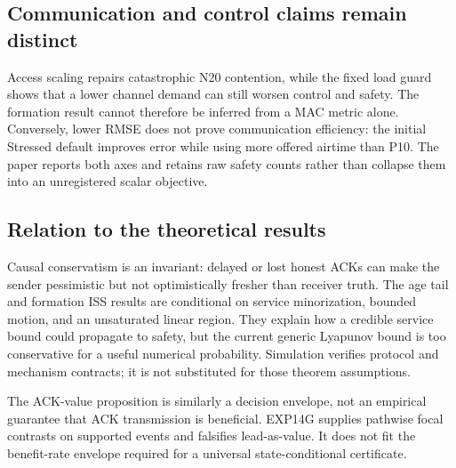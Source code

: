 \subsection{Communication and control claims remain distinct}

Access scaling repairs catastrophic N20 contention, while the fixed load guard
shows that a lower channel demand can still worsen control and safety. The
formation result cannot therefore be inferred from a MAC metric alone.
Conversely, lower RMSE does not prove communication efficiency: the initial
Stressed default improves error while using more offered airtime than P10.
The paper reports both axes and retains raw safety counts rather than collapse
them into an unregistered scalar objective.

\subsection{Relation to the theoretical results}

Causal conservatism is an invariant: delayed or lost honest ACKs can make the
sender pessimistic but not optimistically fresher than receiver truth. The age
tail and formation ISS results are conditional on service minorization,
bounded motion, and an unsaturated linear region. They explain how a credible
service bound could propagate to safety, but the current generic Lyapunov bound
is too conservative for a useful numerical probability. Simulation verifies
protocol and mechanism contracts; it is not substituted for those theorem
assumptions.

The ACK-value proposition is similarly a decision envelope, not an empirical
guarantee that ACK transmission is beneficial. EXP14G supplies pathwise focal
contrasts on supported events and falsifies lead-as-value. It does not fit the
benefit-rate envelope required for a universal state-conditional certificate.
